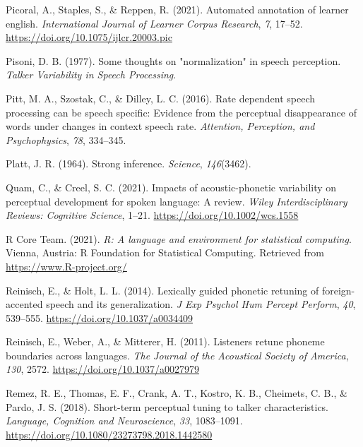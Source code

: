 \documentclass[
  11pt,
  english,
  man,floatsintext]{apa6}
\newlength{\cslhangindent}
\newlength{\cslentryspacingunit} %
\newenvironment{CSLReferences}[2] %
 {%
  \setlength{\parindent}{0pt}
  \ifodd #1
  \let\oldpar\par
  \def\par{\hangindent=\cslhangindent\oldpar}
  \fi
  \setlength{\parskip}{#2\cslentryspacingunit}
 }%
 {}
\begin{document}
\begin{CSLReferences}{1}{0}
\leavevmode{}%
Picoral, A., Staples, S., \& Reppen, R. (2021). Automated annotation of learner english. \emph{International Journal of Learner Corpus Research}, \emph{7}, 17--52. \url{https://doi.org/10.1075/ijlcr.20003.pic}

\leavevmode{}%
Pisoni, D. B. (1977). Some thoughts on "normalization" in speech perception. \emph{Talker Variability in Speech Processing}.

\leavevmode{}%
Pitt, M. A., Szostak, C., \& Dilley, L. C. (2016). Rate dependent speech processing can be speech specific: Evidence from the perceptual disappearance of words under changes in context speech rate. \emph{Attention, Perception, and Psychophysics}, \emph{78}, 334--345.

\leavevmode{}%
Platt, J. R. (1964). Strong inference. \emph{Science}, \emph{146}(3462).

\leavevmode{}%
Quam, C., \& Creel, S. C. (2021). Impacts of acoustic-phonetic variability on perceptual development for spoken language: A review. \emph{Wiley Interdisciplinary Reviews: Cognitive Science}, 1--21. \url{https://doi.org/10.1002/wcs.1558}

\leavevmode{}%
R Core Team. (2021). \emph{R: A language and environment for statistical computing}. Vienna, Austria: R Foundation for Statistical Computing. Retrieved from \url{https://www.R-project.org/}

\leavevmode{}%
Reinisch, E., \& Holt, L. L. (2014). Lexically guided phonetic retuning of foreign-accented speech and its generalization. \emph{J Exp Psychol Hum Percept Perform}, \emph{40}, 539--555. \url{https://doi.org/10.1037/a0034409}

\leavevmode{}%
Reinisch, E., Weber, A., \& Mitterer, H. (2011). Listeners retune phoneme boundaries across languages. \emph{The Journal of the Acoustical Society of America}, \emph{130}, 2572. \url{https://doi.org/10.1037/a0027979}

\leavevmode{}%
Remez, R. E., Thomas, E. F., Crank, A. T., Kostro, K. B., Cheimets, C. B., \& Pardo, J. S. (2018). Short-term perceptual tuning to talker characteristics. \emph{Language, Cognition and Neuroscience}, \emph{33}, 1083--1091. \url{https://doi.org/10.1080/23273798.2018.1442580}


\end{CSLReferences}
\end{document}
